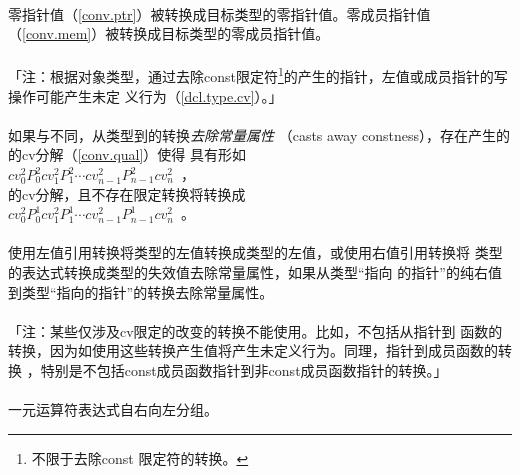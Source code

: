 \paragraph{}
零指针值（\ref{conv.ptr}）被转换成目标类型的零指针值。零成员指针值
（\ref{conv.mem}）被转换成目标类型的零成员指针值。

\paragraph{}
「注：根据对象类型，通过去除const限定符\footnote{不限于去除const
限定符的转换。}的产生的指针，左值或成员指针的写操作可能产生未定
义行为（\ref{dcl.type.cv}）。」

\paragraph{}
如果与不同，从类型到的转换\textit{去除常量属性}
（casts away constness），存在产生的的cv分解（\ref{conv.qual}）使得
具有形如                                                               \\
\mbox{\qquad$cv_0^2P_0^2cv_1^2P_1^2 \cdots cv_{n-1}^2P_{n-1}^2cv_n^2$
，}                                                             \\
的cv分解，且不存在限定转换将转换成                                     \\
\mbox{\qquad$cv_0^2P_0^1cv_1^2P_1^1 \cdots cv_{n-1}^2P_{n-1}^1cv_n^2$
。}

\paragraph{}
使用左值引用转换将类型的左值转换成类型的左值，或使用右值引用转换将
类型的表达式转换成类型的失效值去除常量属性，如果从类型``指向
的指针''的纯右值到类型``指向的指针''的转换去除常量属性。

\paragraph{}
「注：某些仅涉及cv限定的改变的转换不能使用。比如，不包括从指针到
函数的转换，因为如使用这些转换产生值将产生未定义行为。同理，指针到成员函数的转换
，特别是不包括const成员函数指针到非const成员函数指针的转换。」

\paragraph{}
一元运算符表达式自右向左分组。


